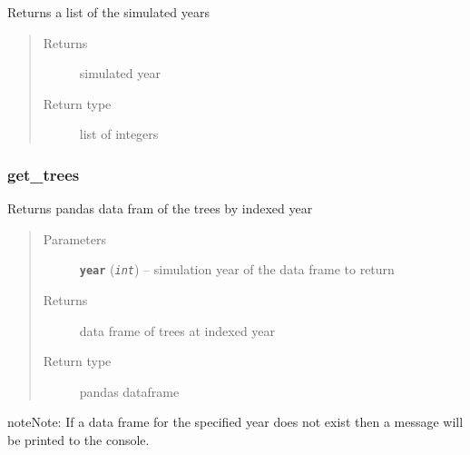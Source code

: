 \documentclass[letterpaper,10pt,english]{sphinxmanual}
\begin{document}
\begin{fulllineitems}
\label{Fvsfuels:fuels.Fvsfuels.get_simulation_years}
Returns a list of the simulated years
\begin{quote}\begin{description}
\item[{Returns}] \leavevmode
simulated year

\item[{Return type}] \leavevmode
list of integers

\end{description}\end{quote}

\end{fulllineitems}



\subsubsection{get\_trees}
\label{Fvsfuels:get-trees}

\begin{fulllineitems}
\label{Fvsfuels:fuels.Fvsfuels.get_trees}
Returns pandas data fram of the trees by indexed year
\begin{quote}\begin{description}
\item[{Parameters}] \leavevmode
\textbf{\texttt{year}} (\emph{\texttt{int}}) -- simulation year of the data frame to return

\item[{Returns}] \leavevmode
data frame of trees at indexed year

\item[{Return type}] \leavevmode
pandas dataframe

\end{description}\end{quote}

\begin{notice}{note}{Note:}
If a data frame for the specified year does not exist then
a message will be printed to the console.
\end{notice}

\end{fulllineitems}
\end{document}
